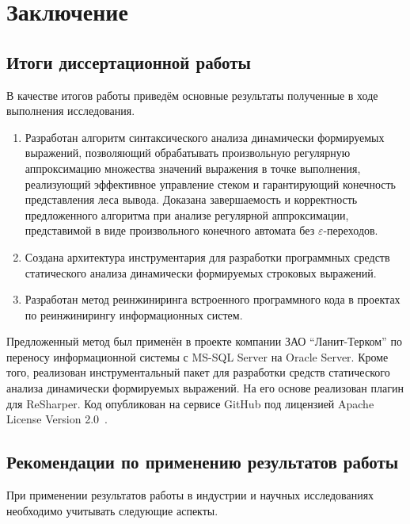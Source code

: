 \chapter*{Заключение}                       %

\section*{Итоги диссертационной работы}

В качестве итогов работы приведём основные результаты полученные в ходе выполнения исследования.

\begin{enumerate}
    \item Разработан алгоритм синтаксического анализа динамически формируемых выражений, позволяющий обрабатывать произвольную регулярную аппроксимацию множества значений выражения в точке выполнения, реализующий 
    эффективное управление стеком и гарантирующий конечность представления леса вывода. Доказана завершаемость и корректность предложенного алгоритма при анализе регулярной аппроксимации, представимой в виде произвольного конечного автомата без $\varepsilon$-переходов.
    \item Создана архитектура инструментария для разработки программных средств статического анализа динамически формируемых строковых выражений.
    \item Разработан метод реинжиниринга встроенного программного кода в проектах по реинжинирингу информационных систем. 
\end{enumerate}

Предложенный метод был применён в проекте компании ЗАО ``Ланит-Терком'' по переносу информационной системы с MS-SQL Server на Oracle Server. Кроме того, реализован инструментальный пакет для разработки средств статического анализа динамически формируемых выражений. На его основе реализован плагин для ReSharper. Код опубликован на сервисе GitHub под лицензией Apache License Version 2.0~\cite{YCUrl}.

\section*{Рекомендации по применению результатов работы}

При применении результатов работы в индустрии и научных исследованиях необходимо учитывать следующие аспекты.

